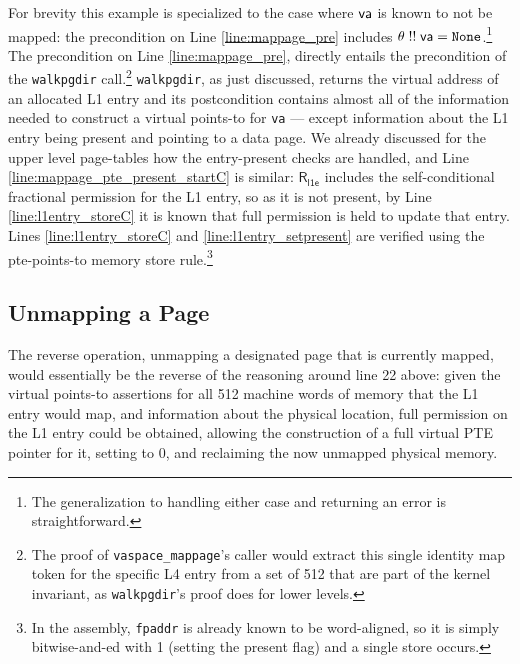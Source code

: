 For brevity this example is specialized to the case where $\mathsf{va}$ is known to not be mapped:
the precondition on Line \ref{line:mappage_pre} includes $\theta \; !!\; \mathsf{va} = \texttt{None}$.\footnote{
  The generalization to handling either case and returning an error is straightforward.
}
The precondition on Line \ref{line:mappage_pre}, directly entails
the precondition of the \lstinline|walkpgdir| call.\footnote{The proof of \lstinline|vaspace_mappage|'s caller
would extract this single identity map token for the specific L4 entry from a set of 512 that are
part of the kernel invariant, as \lstinline|walkpgdir|'s proof does for lower levels.
}
\lstinline|walkpgdir|, as just discussed,
returns the virtual address of an allocated L1 entry and its postcondition contains almost all of the information
needed to construct a virtual points-to for \lstinline|va| --- except information about the L1 entry
being present and pointing to a data page.
We already discussed for the upper level page-tables how the entry-present checks are handled, and
Line \ref{line:mappage_pte_present_startC} is similar: $\mathsf{R}_{\textsf{l1e}}$ includes the self-conditional
fractional permission for the L1 entry, so as it is not present, by Line \ref{line:l1entry_storeC}
it is known that full permission is held to update that entry.
Lines \ref{line:l1entry_storeC} and \ref{line:l1entry_setpresent} are verified using the pte-points-to
memory store rule.\footnote{In the assembly, \lstinline|fpaddr| is already known to be word-aligned, so it is simply bitwise-and-ed with 1
(setting the present flag) and a single store occurs.}

\ifPLDI
\else
\subsection{Unmapping a Page}
The reverse operation, unmapping a designated page that is currently mapped,
would essentially be the reverse of
the reasoning around line 22 above: given the virtual points-to assertions for all 512
machine words of memory that the L1 entry would map,
and information about the physical location, 
full permission on the L1 entry could be obtained, allowing the construction of a
full virtual PTE pointer for it, setting to 0, and reclaiming the now unmapped physical memory.
\fi

